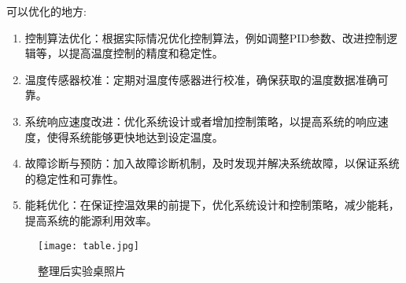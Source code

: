 \documentclass[dvipsnames, svgnames,a4paper,11pt]{article}
\begin{document}
    可以优化的地方:

        \begin{enumerate}
            \item 控制算法优化：根据实际情况优化控制算法，例如调整PID参数、改进控制逻辑等，以提高温度控制的精度和稳定性。
            \item 温度传感器校准：定期对温度传感器进行校准，确保获取的温度数据准确可靠。
            \item 系统响应速度改进：优化系统设计或者增加控制策略，以提高系统的响应速度，使得系统能够更快地达到设定温度。
            \item 故障诊断与预防：加入故障诊断机制，及时发现并解决系统故障，以保证系统的稳定性和可靠性。
            \item 能耗优化：在保证控温效果的前提下，优化系统设计和控制策略，减少能耗，提高系统的能源利用效率。
        \end{enumerate}




        \begin{figure}[htbp]
            \centering
            \texttt{[image: table.jpg]}
            \caption{整理后实验桌照片}
            \label{fig:table}
        \end{figure}
\end{document}
